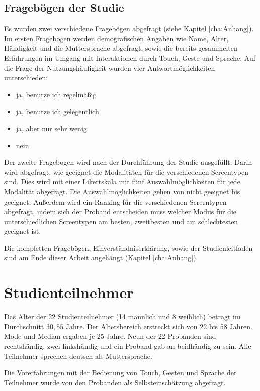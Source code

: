 \subsection[Fragebögen]{Fragebögen der Studie}
Es wurden zwei verschiedene Fragebögen abgefragt (siehe Kapitel \ref{cha:Anhang}). 
Im ersten Fragebogen werden demografischen Angaben wie Name, Alter, Händigkeit und die Muttersprache abgefragt, sowie die bereits gesammelten Erfahrungen im Umgang mit Interaktionen durch Touch, Geste und Sprache. 
Auf die Frage der Nutzungshäufigkeit wurden vier Antwortmöglichkeiten unterschieden:
\begin{itemize}
	\item ja, benutze ich regelmäßig 
	\item ja, benutze ich gelegentlich
	\item ja, aber nur sehr wenig
	\item nein
\end{itemize}
Der zweite Fragebogen wird nach der Durchführung der Studie ausgefüllt. 
Darin wird abgefragt, wie geeignet die Modalitäten für die verschiedenen Screentypen sind. 
Dies wird mit einer Likertskala mit fünf Auswahlmöglichkeiten für jede Modalität abgefragt.  
Die Auswahlmöglichkeiten gehen von nicht geeignet bis geeignet. 
Außerdem wird ein Ranking für die verschiedenen Screentypen abgefragt, indem sich der Proband entscheiden muss welcher Modus für die unterschiedlichen Screentypen am besten, zweitbesten und am schlechtesten geeignet ist.  

Die kompletten Fragebögen, Einverständniserklärung, sowie der Studienleitfaden sind am Ende dieser Arbeit angehängt (Kapitel \ref{cha:Anhang}).
\section[Studienteilnehmer]{Studienteilnehmer}
Das Alter der 22 Studienteilnehmer (14 männlich und 8 weiblich) beträgt im Durchschnitt $30,55$ Jahre. 
Der Altersbereich erstreckt sich von 22 bis 58 Jahren. 
Mode und Median ergaben je 25 Jahre. Neun der 22 Probanden sind rechtshändig, zwei linkshändig und ein Proband gab an beidhändig zu sein. 
Alle Teilnehmer sprechen deutsch als Muttersprache.

Die Vorerfahrungen mit der Bedienung von Touch, Gesten und Sprache der Teilnehmer wurde von den Probanden als Selbsteinschätzung abgefragt. 

